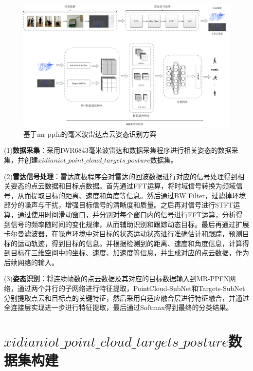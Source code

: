 \begin{figure}[htbp]
    \centering
    \includegraphics[width=0.95\linewidth]{imgs/mr-ppfn structure.pdf}
    \caption{基于mr-ppfn的毫米波雷达点云姿态识别方案}
    \label{fig:mr-ppfn structure strategy}
\end{figure}

(1)\textbf{数据采集}：采用IWR6843毫米波雷达和数据采集程序进行相关姿态的数据采集，并创建$xidianiot\_point\_cloud\_targets\_posture$数据集。

(2)\textbf{雷达信号处理}：雷达底板程序会对雷达的回波数据进行对应的信号处理得到相关姿态的点云数据和目标点数据。首先通过FFT运算，将时域信号转换为频域信号，从而提取目标的距离、速度和角度等信息。然后通过BW Filter，过滤掉环境部分的噪声与干扰，增强目标信号的清晰度和质量。之后再对信号进行STFT运算，通过使用时间滑动窗口，并分别对每个窗口内的信号进行FFT运算，分析得到信号的频率随时间的变化规律，从而辅助识别和跟踪动态目标。最后再通过扩展卡尔曼滤波器，在噪声环境中对目标的状态运动状态进行准确估计和跟踪，预测目标的运动轨迹，得到目标的信息。并根据检测到的距离、速度和角度信息，计算得到目标在三维空间中的坐标、速度、加速度等信息，并生成对应的点云数据，作为后续网络的输入。

(3)\textbf{姿态识别}：将连续帧数的点云数据及其对应的目标数据输入到MR-PPFN网络，通过两个并行的子网络进行特征提取，PointCloud-SubNet和Targets-SubNet分别提取点云和目标点的关键特征，然后采用自适应融合层进行特征融合，并通过全连接层实现进一步进行特征提取，最后通过Softmax得到最终的分类结果。                

\section{$xidianiot\_point\_cloud\_targets\_posture$数据集构建}
\label{sec:dataset-build}
